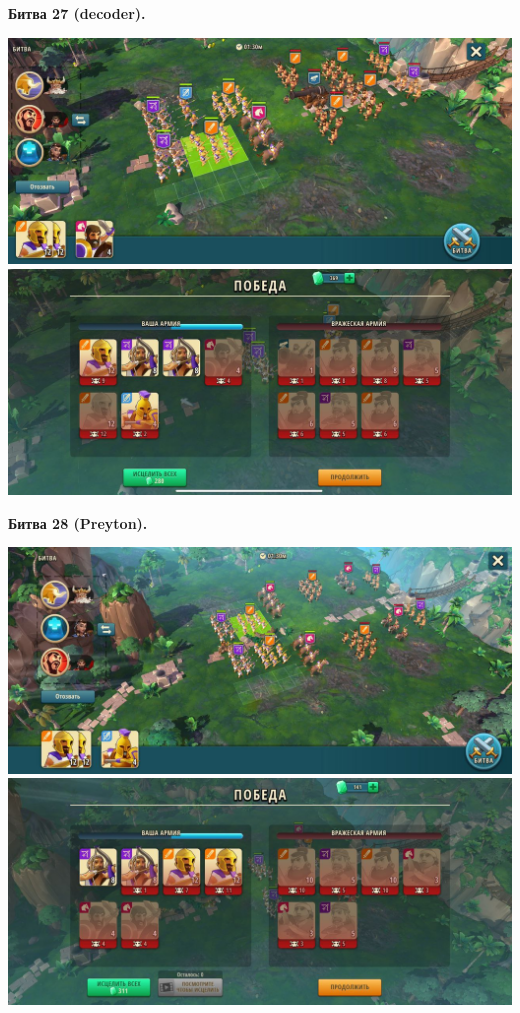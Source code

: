 \newpage
\begin{center}
	\hypertarget{fight27}{\textbf{Битва 27 (decoder).}}
\end{center}
\noindent\includegraphics[width=\linewidth]{./parts/media/TreasureHunt/27/decoder/photo_2022-04-13_17-26-43.jpg} \newline
\noindent\includegraphics[width=\linewidth]{./parts/media/TreasureHunt/27/decoder/photo_2022-04-13_17-27-02.jpg} \newline

\newpage
\begin{center}
	\hypertarget{fight28}{\textbf{Битва 28 (Preyton).}}
\end{center}
\noindent\includegraphics[width=\linewidth]{./parts/media/TreasureHunt/28/Preyton/28.jpg} \newline
\noindent\includegraphics[width=\linewidth]{./parts/media/TreasureHunt/28/Preyton/28..jpg} \newline

